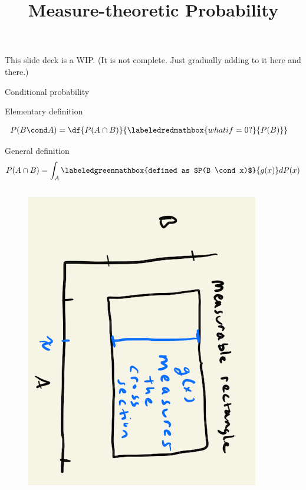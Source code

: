 \documentclass[10pt]{beamer}
\title{Measure-theoretic Probability}
\begin{document}
\maketitle


\begin{frame}[standout]
This slide deck is a WIP.
\vfill
(It is not complete.  Just gradually adding to it here and there.)
\end{frame}

\begin{frame}{Conditional probability}
\begin{sblock}{Elementary definition}

\begin{align*}
P(B \cond A) &= \df{P(A \cap B)}{\labeledredmathbox{what if = 0?}{P(B)}} 	
\end{align*}
\end{sblock}

\begin{sblock}{General definition}
\[ P(A \cap B)  = \int_A \labeledgreenmathbox{defined as $P(B \cond x)$}{g(x)} dP(x) \]

\begin{columns}

\begin{column}{0.45\textwidth}
\begin{figure}
\centering 
\includegraphics[angle=90,width=.7\textwidth]{images/conditional_probability_exists.png}	
\end{figure}
\end{column}


\end{columns}
\end{sblock}
\end{frame}
\end{document}
